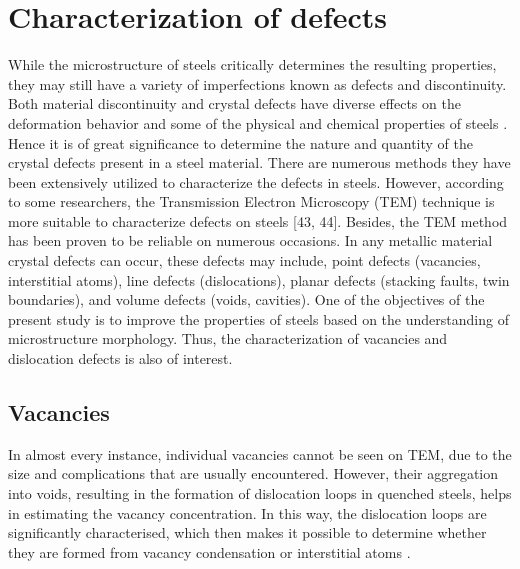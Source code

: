 \documentclass[12pt]{report}
\begin{document}
\section{Characterization of defects} 
While the microstructure of steels critically determines the resulting properties, they may still have a variety of imperfections known as defects and discontinuity. Both material discontinuity and crystal defects have diverse effects on the deformation behavior and some of the physical and chemical properties of steels \cite{suryanarayana2017microstructure}. Hence it is of great significance to determine the nature and quantity of the crystal defects present in a steel material. 
There are numerous methods they have been extensively utilized to characterize the defects in steels. However, according to some researchers, the Transmission Electron Microscopy (TEM) technique is more suitable to characterize defects on steels [43, 44]. Besides, the TEM method has been proven to be reliable on numerous occasions. In any metallic material crystal defects can occur, these defects may include, point defects (vacancies, interstitial atoms), line defects (dislocations), planar defects (stacking faults, twin boundaries), and volume defects (voids, cavities). One of the objectives of the present study is to improve the properties of steels based on the understanding of microstructure morphology. Thus, the characterization of vacancies and dislocation defects is also of interest.

\subsection{Vacancies} 
 In almost every instance, individual vacancies cannot be seen on TEM, due to the size and complications that are usually encountered. However, their aggregation into voids, resulting in the formation of dislocation loops in quenched steels, helps in estimating the vacancy concentration. In this way, the dislocation loops are significantly characterised, which then makes it possible to determine whether they are formed from vacancy condensation or interstitial atoms \cite{suryanarayana2017microstructure}.
\end{document}
